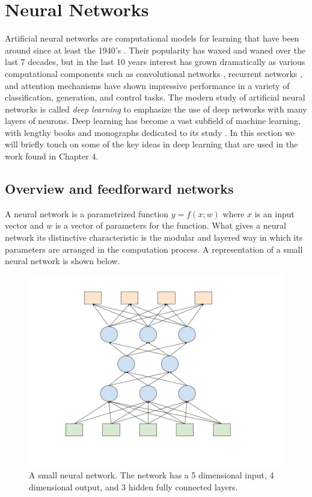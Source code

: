 \section{Neural Networks}

Artificial neural networks are computational models for learning that have been around since at least the 1940's \cite{mcculloch1943logical, hebb2005organization}. Their popularity has waxed and waned over the last 7 decades, but in the last 10 years interest has grown dramatically as various computational components such as convolutional networks \cite{krizhevsky2012imagenet, kim2014convolutional, mnih2015human}, recurrent networks \cite{mikolov2010recurrent, graves2013generating, mnih2014recurrent}, and attention mechanisms \cite{gregor2015draw, vaswani2017attention, xu2015show} have shown impressive performance in a variety of classification, generation, and control tasks. The modern study of artificial neural networks is called {\em deep learning} to emphasize the use of deep networks with many layers of neurons. Deep learning has become a vast subfield of machine learning, with lengthy books and monographs dedicated to its study \cite{goodfellow2016deep, schmidhuber2015deep}. In this section we will briefly touch on some of the key ideas in deep learning that are used in the work found in Chapter 4.

\subsection{Overview and feedforward networks}

A neural network is a parametrized function $y = f(x;w)$ where $x$ is an input vector and $w$ is a vector of parameters for the function. What gives a neural network its distinctive characteristic is the modular and layered way in which its parameters are arranged in the computation process. A representation of a small neural network is shown below.

\begin{figure}
    \centering
\includegraphics[scale=0.4]{images/Feedforward_network.jpg}
    \caption{A small neural network. The network has a 5 dimensional input, 4 dimensional output, and 3 hidden fully connected layers.}
    \label{fig:smallnn}
\end{figure}

